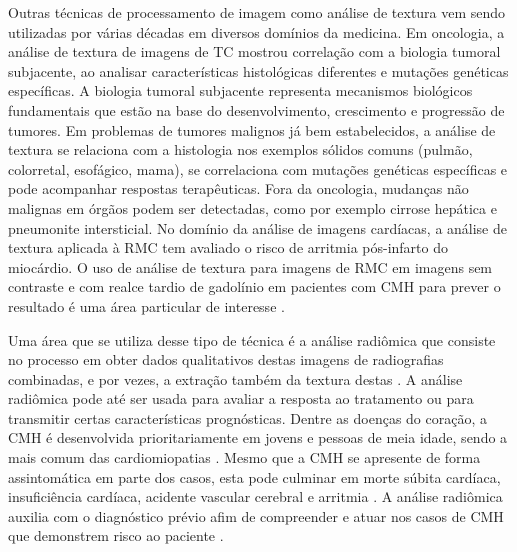 Outras técnicas de processamento de imagem como análise de textura vem sendo utilizadas por várias décadas em diversos domínios da medicina. Em oncologia, a análise de textura de imagens de \gls{TC} mostrou correlação com a biologia tumoral subjacente, ao analisar características histológicas diferentes e mutações genéticas específicas. A biologia tumoral subjacente representa mecanismos biológicos fundamentais que estão na base do desenvolvimento, crescimento e progressão de tumores. Em problemas de tumores malignos já bem estabelecidos, a análise de textura se relaciona com a histologia nos exemplos sólidos comuns (pulmão, colorretal, esofágico, mama), se correlaciona com mutações genéticas específicas e pode acompanhar respostas terapêuticas. Fora da oncologia, mudanças não malignas em órgãos podem ser detectadas, como por exemplo cirrose hepática e pneumonite intersticial. No domínio da análise de imagens cardíacas, a análise de textura aplicada à \gls{RMC} tem avaliado o risco de arritmia pós-infarto do miocárdio. O uso de análise de textura para imagens de \gls{RMC} em imagens sem contraste e com realce tardio de gadolínio em pacientes com \gls{CMH} para prever o resultado é uma área particular de interesse \cite{schofieldTextureAnalysisCardiovascular2019a}.


Uma área que se utiliza desse tipo de técnica é a análise radiômica que consiste no processo em obter dados qualitativos destas imagens de radiografias combinadas, e por vezes, a extração também da textura destas \cite{lambinRadiomicsExtractingMore2012}. A análise radiômica pode até ser usada para avaliar a resposta ao tratamento ou para transmitir certas características prognósticas. Dentre as doenças do coração, a \gls{CMH} é desenvolvida prioritariamente em jovens e pessoas de meia idade, sendo a mais comum das cardiomiopatias . Mesmo que a \gls{CMH} se apresente de forma assintomática em parte dos casos, esta pode culminar em morte súbita cardíaca, insuficiência cardíaca, acidente vascular cerebral e arritmia . A análise radiômica auxilia com o diagnóstico prévio afim de compreender e atuar nos casos de \gls{CMH} que demonstrem risco ao paciente \cite{kwonComparisonMortalityCause2022}.



